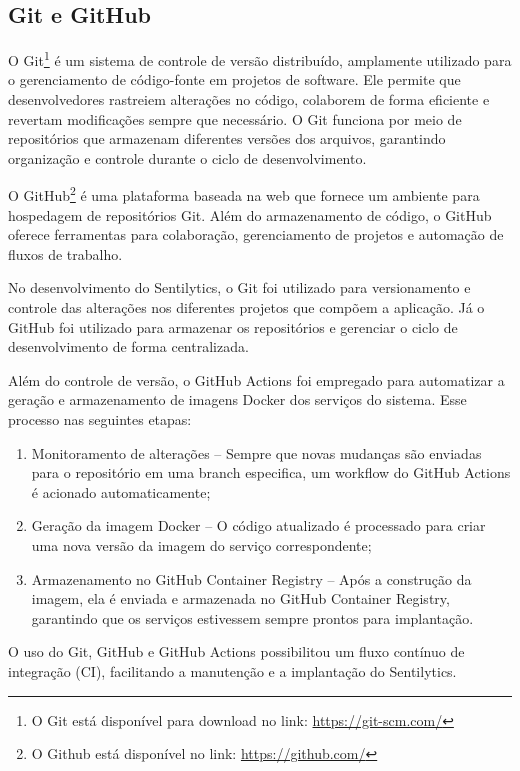 \documentclass[
	12pt,				%
	oneside,			%
	a4paper,			%
	english,			%
	french,				%
	spanish,			%
	brazil				%
	]{abntex2}
\begin{document}
\hypertarget{git-e-github}{%
\subsection{Git e GitHub}\label{git-e-github}}

O Git\footnote{O Git está disponível para download no link:
  \url{https://git-scm.com/}} é um sistema de controle de versão
distribuído, amplamente utilizado para o gerenciamento de código-fonte
em projetos de software. Ele permite que desenvolvedores rastreiem
alterações no código, colaborem de forma eficiente e revertam
modificações sempre que necessário. O Git funciona por meio de
repositórios que armazenam diferentes versões dos arquivos, garantindo
organização e controle durante o ciclo de desenvolvimento.

O GitHub\footnote{O Github está disponível no link:
  \url{https://github.com/}} é uma plataforma baseada na web que fornece
um ambiente para hospedagem de repositórios Git. Além do armazenamento
de código, o GitHub oferece ferramentas para colaboração, gerenciamento
de projetos e automação de fluxos de trabalho.

No desenvolvimento do Sentilytics, o Git foi utilizado para
versionamento e controle das alterações nos diferentes projetos que
compõem a aplicação. Já o GitHub foi utilizado para armazenar os
repositórios e gerenciar o ciclo de desenvolvimento de forma
centralizada.

Além do controle de versão, o GitHub Actions foi empregado para
automatizar a geração e armazenamento de imagens Docker dos serviços do
sistema. Esse processo nas seguintes etapas:

\begin{enumerate}
\def\labelenumi{\arabic{enumi})}
\tightlist
\item
  Monitoramento de alterações -- Sempre que novas mudanças são enviadas
  para o repositório em uma branch especifica, um workflow do GitHub
  Actions é acionado automaticamente;
\item
  Geração da imagem Docker -- O código atualizado é processado para
  criar uma nova versão da imagem do serviço correspondente;
\item
  Armazenamento no GitHub Container Registry -- Após a construção da
  imagem, ela é enviada e armazenada no GitHub Container Registry,
  garantindo que os serviços estivessem sempre prontos para implantação.
\end{enumerate}

O uso do Git, GitHub e GitHub Actions possibilitou um fluxo contínuo de
integração (CI), facilitando a manutenção e a implantação do
Sentilytics.
\end{document}
